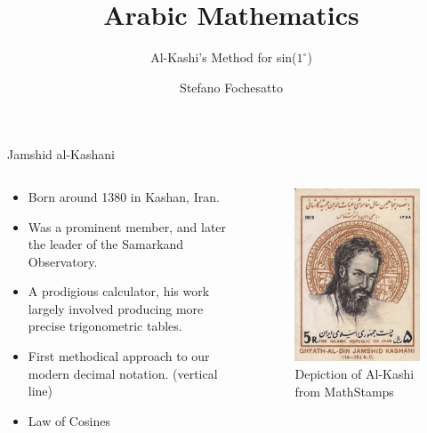 \documentclass[10pt]{beamer}
\title{Arabic Mathematics}
\subtitle{Al-Kashi's Method for sin($1^{\circ}$)}
\date{}
\author{Stefano Fochesatto}
\begin{document}
\maketitle

\begin{frame}{Jamshid al-Kashani}
  \begin{columns}[T]
    \begin{column}{.60\textwidth}
   
      \begin{itemize}
        \item Born around 1380 in Kashan, Iran.
        \item Was a prominent member, and later the leader of the Samarkand Observatory.
        \item A prodigious calculator, his work largely involved producing more precise trigonometric tables. 
        \item First methodical approach to our modern decimal notation. (vertical line)
        \item Law of Cosines
      \end{itemize}

    \end{column}
    \begin{column}{.40\textwidth}
  \begin{figure}
    \begin{center}
      \includegraphics[width=.75\textwidth]{samarkand.jpg}
    \caption{Depiction of Al-Kashi from MathStamps}
    \end{center}
  \end{figure}
      \end{column}

 
    
  \end{columns}
\end{frame}
\end{document}
